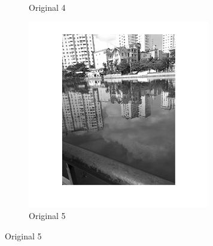 \begin{center}
\begin{figure}[h]
\begin{subfigure}[b]{0.18\textwidth}
                 \caption{Original 4}
                  \label{fig:original 4}
        \end{subfigure}
        \begin{subfigure}[b]{0.18\textwidth}
                        \includegraphics[width=\linewidth]{pond5.png}
                         \caption{Original 5}
                          \label{fig:original 5}
                \end{subfigure}
      \end{figure}
\end{center}
\vspace{2cm}

